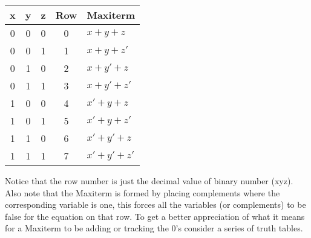 \vspace{.1in}
\begin{tabular}{c|c|c|cl}
x & y & z & Row & Maxiterm   \\ \hline
0 & 0 & 0 & 0   & $x+y+z$    \\
0 & 0 & 1 & 1   & $x+y+z'$   \\
0 & 1 & 0 & 2   & $x+y'+z$   \\
0 & 1 & 1 & 3   & $x+y'+z'$  \\
1 & 0 & 0 & 4   & $x'+y+z$   \\
1 & 0 & 1 & 5   & $x'+y+z'$  \\
1 & 1 & 0 & 6   & $x'+y'+z$  \\
1 & 1 & 1 & 7   & $x'+y'+z'$ \\
\end{tabular}
\vspace{.1in}

Notice that the row number is just the decimal value of binary number (xyz).  Also note that the Maxiterm is formed by placing complements where the corresponding variable is one, this forces all the variables (or complements) to be false for the equation on that row.    To get a better appreciation of what it means for a Maxiterm to be adding or tracking the 0's consider a series of truth tables.

